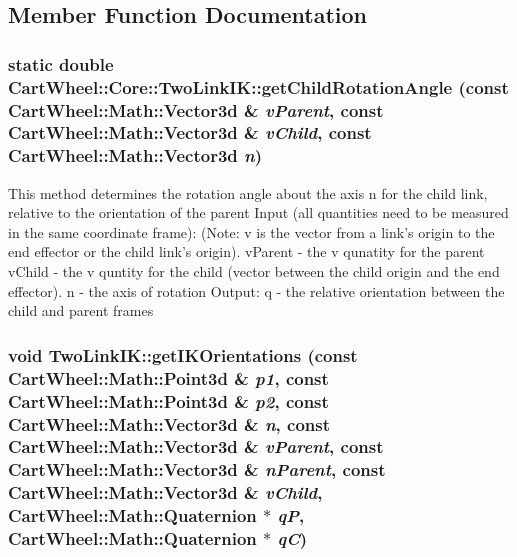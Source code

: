 \subsection{Member Function Documentation}
\hypertarget{classCartWheel_1_1Core_1_1TwoLinkIK_a7286e17fe5def23330d98c013630a5bc}{
\subsubsection[{getChildRotationAngle}]{\setlength{\rightskip}{0pt plus 5cm}static double CartWheel::Core::TwoLinkIK::getChildRotationAngle (const {\bf CartWheel::Math::Vector3d} \& {\em vParent}, \/  const {\bf CartWheel::Math::Vector3d} \& {\em vChild}, \/  const {\bf CartWheel::Math::Vector3d} {\em n})}}
\label{classCartWheel_1_1Core_1_1TwoLinkIK_a7286e17fe5def23330d98c013630a5bc}
This method determines the rotation angle about the axis n for the child link, relative to the orientation of the parent Input (all quantities need to be measured in the same coordinate frame): (Note: v is the vector from a link's origin to the end effector or the child link's origin). vParent -\/ the v qunatity for the parent vChild -\/ the v quntity for the child (vector between the child origin and the end effector). n -\/ the axis of rotation Output: q -\/ the relative orientation between the child and parent frames \hypertarget{classCartWheel_1_1Core_1_1TwoLinkIK_a18d95e0099d3419cd6a1d7c34dd291a7}{
\subsubsection[{getIKOrientations}]{\setlength{\rightskip}{0pt plus 5cm}void TwoLinkIK::getIKOrientations (const {\bf CartWheel::Math::Point3d} \& {\em p1}, \/  const {\bf CartWheel::Math::Point3d} \& {\em p2}, \/  const {\bf CartWheel::Math::Vector3d} \& {\em n}, \/  const {\bf CartWheel::Math::Vector3d} \& {\em vParent}, \/  const {\bf CartWheel::Math::Vector3d} \& {\em nParent}, \/  const {\bf CartWheel::Math::Vector3d} \& {\em vChild}, \/  {\bf CartWheel::Math::Quaternion} $\ast$ {\em qP}, \/  {\bf CartWheel::Math::Quaternion} $\ast$ {\em qC})}}
